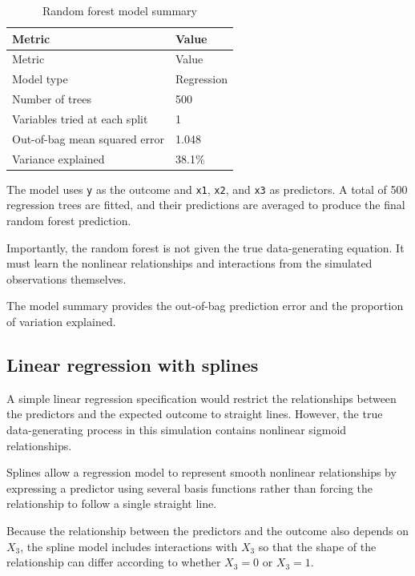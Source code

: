 \documentclass[
  letterpaper,
  DIV=11,
  numbers=noendperiod]{scrreprt}
\begin{document}
\begin{longtable}[]{@{}ll@{}}
\caption{Random forest model summary}\tabularnewline
\toprule\noalign{}
Metric & Value \\
\midrule\noalign{}
\endfirsthead
\toprule\noalign{}
Metric & Value \\
\midrule\noalign{}
\endhead
\bottomrule\noalign{}
\endlastfoot
Model type & Regression \\
Number of trees & 500 \\
Variables tried at each split & 1 \\
Out-of-bag mean squared error & 1.048 \\
Variance explained & 38.1\% \\
\end{longtable}

The model uses \texttt{y} as the outcome and \texttt{x1}, \texttt{x2},
and \texttt{x3} as predictors. A total of 500 regression trees are
fitted, and their predictions are averaged to produce the final random
forest prediction.

Importantly, the random forest is not given the true data-generating
equation. It must learn the nonlinear relationships and interactions
from the simulated observations themselves.

The model summary provides the out-of-bag prediction error and the
proportion of variation explained.

\subsection{Linear regression with
splines}\label{linear-regression-with-splines}

A simple linear regression specification would restrict the
relationships between the predictors and the expected outcome to
straight lines. However, the true data-generating process in this
simulation contains nonlinear sigmoid relationships.

Splines allow a regression model to represent smooth nonlinear
relationships by expressing a predictor using several basis functions
rather than forcing the relationship to follow a single straight line.

Because the relationship between the predictors and the outcome also
depends on \(X_3\), the spline model includes interactions with \(X_3\)
so that the shape of the relationship can differ according to whether
\(X_3 = 0\) or \(X_3 = 1\).
\end{document}
